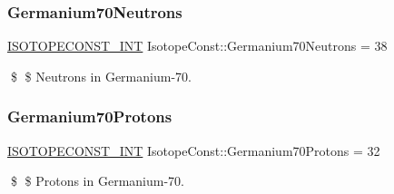 \subsubsection{\texorpdfstring{Germanium70\+Neutrons}{Germanium70Neutrons}}
{\footnotesize\ttfamily \mbox{\hyperlink{group___isotope_const-_macros_ga5f18360b3e99483a35c32d789e62621c}{I\+S\+O\+T\+O\+P\+E\+C\+O\+N\+S\+T\+\_\+\+I\+NT}} Isotope\+Const\+::\+Germanium70\+Neutrons = 38}

\$ \$ Neutrons in Germanium-\/70. \mbox{\label{group___isotope_const-_germanium-_ge70_ga5d2b1262223c1f5f79beb862eb79d023}} 
\subsubsection{\texorpdfstring{Germanium70\+Protons}{Germanium70Protons}}
{\footnotesize\ttfamily \mbox{\hyperlink{group___isotope_const-_macros_ga5f18360b3e99483a35c32d789e62621c}{I\+S\+O\+T\+O\+P\+E\+C\+O\+N\+S\+T\+\_\+\+I\+NT}} Isotope\+Const\+::\+Germanium70\+Protons = 32}

\$ \$ Protons in Germanium-\/70. 